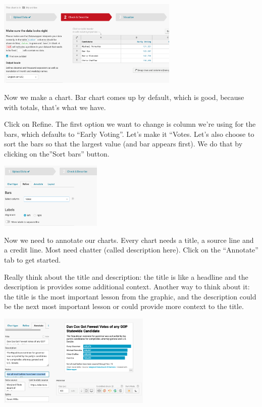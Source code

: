 \documentclass[
  letterpaper,
  DIV=11,
  numbers=noendperiod]{scrreprt}
\begin{document}
\includegraphics[width=3.41in,height=\textheight]{./images/datawrapper3.png}

Now we make a chart. Bar chart comes up by default, which is good,
because with totals, that's what we have.

Click on Refine. The first option we want to change is column we're
using for the bars, which defaults to ``Early Voting''. Let's make it
``Votes. Let's also choose to sort the bars so that the largest value
(and bar appears first). We do that by clicking on the''Sort bars''
button.

\includegraphics[width=1.92in,height=\textheight]{./images/datawrapper4.png}

Now we need to annotate our charts. Every chart needs a title, a source
line and a credit line. Most need chatter (called description here).
Click on the ``Annotate'' tab to get started.

Really think about the title and description: the title is like a
headline and the description is provides some additional context.
Another way to think about it: the title is the most important lesson
from the graphic, and the description could be the next most important
lesson or could provide more context to the title.

\includegraphics[width=2.86in,height=\textheight]{./images/datawrapper5.png}
\end{document}
